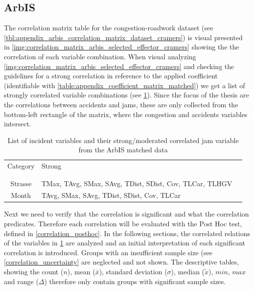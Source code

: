 \subsection{ArbIS}
\label{analysis_processing_correlation_baysis_matched}
The correlation matrix table for the congestion-roadwork dataset (see \cref{tbl:appendix_arbis_correlation_matrix_dataset_cramers}) is visual presented in \cref{img:correlation_matrix_arbis_selected_effector_cramers} showing the the correlation of each variable combination. When visual analyzing \cref{img:correlation_matrix_arbis_selected_effector_cramers} and checking the guidelines for a strong correlation in reference to the applied coefficient (identifiable with \cref{table:appendix_coefficient_matrix_matched}) we get a list of strongly correlated variable combinations (see \cref{tbl:correlation_list_arbis_matched}). Since the focus of the thesis are the correlations between accidents and jams, these are only collected from the bottom-left rectangle of the matrix, where the congestion and accidents variables intersect.
\begin{table}[h!]
	\centering
	\begin{tabular}{c|l|l}  
		Category & Strong \\
		\\[-1em]
		\hline
		\\[-1em]
		Strasse & TMax, TAvg, SMax, SAvg, TDist, SDist, Cov, TLCar, TLHGV \\ 
 		Month & TAvg, SMax, SAvg, TDist, SDist, Cov, TLCar \\
	\end{tabular}
  \caption{List of incident variables and their strong/moderated correlated jam variable from the ArbIS matched data}
  \label{tbl:correlation_list_arbis_matched}
\end{table}
Next we need to verify that the correlation is significant and what the correlation predicates. Therefore each correlation will be evaluated with the Post Hoc test, defined in \cref{correlation_posthoc}. In the following sections, the correlated relations of the variables in \cref{tbl:correlation_list_arbis_matched} are analyzed and an initial interpretation of each significant correlation is introduced. Groups with an insufficient sample size (see \cref{correlation_uncertainty} are neglected and not shown. The descriptive tables, showing the count ($n$), mean ($\bar{x}$), standard deviation ($\sigma$), median ($\tilde{x}$), $min$, $max$ and range ($\Delta$) therefore only contain groups with significant sample sizes.
